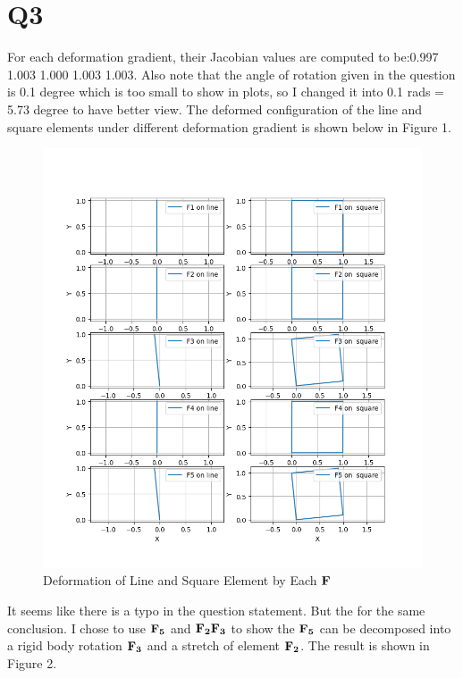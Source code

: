 \documentclass[a4paper,12pt]{article} %
\begin{document}
\section*{Q3}
For each deformation gradient, their Jacobian values are computed to be:0.997 1.003 1.000 1.003 1.003.
Also note that the angle of rotation given in the question is 0.1 degree which is too small to show in plots, so
I changed it into 0.1 rads = 5.73 degree to have better view.
The deformed configuration of the line and square elements under different deformation gradient is shown below in Figure 1.
    \begin{figure}[htbp]
        \center
        \includegraphics[scale=0.6]{HW2Q3_1.png}
        \caption{Deformation of Line and Square Element by Each $\mathbf{F}$}
    \end{figure}
It seems like there is a typo in the question statement. But the for the same conclusion.
I chose to use $\mathbf{F_5}$ and $\mathbf{F_2F_3}$ to show the $\mathbf{F_5}$ can be decomposed into a rigid 
body rotation $\mathbf{F_3}$ and a stretch of element $\mathbf{F_2}$. The result is shown in Figure 2.
\end{document}
